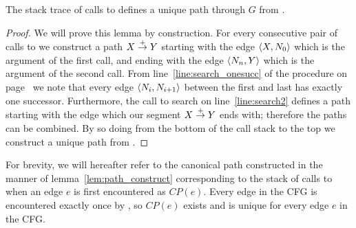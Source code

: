 \documentclass[12pt,titlepage,twoside]{article}
\begin{document}
\begin{lemma}\label{lem:path_construct}
The stack trace of calls to  defines a unique path
through $G$ from .
\end{lemma}
\begin{proof}
We will prove this lemma by construction.  For every consecutive pair
of calls to  we construct a path $X\stackrel{+}{\rightarrow} Y$ starting with the
edge $\left\langle X,N_0 \right\rangle$ which is the argument of the first call, and
ending with the edge $\left\langle N_n, Y \right\rangle$ which is the argument of the
second call.  From line~\ref{line:search_onesucc} of the 
procedure on page~\pageref{line:search_onesucc} we note that every
edge $\left\langle N_i, N_{i+1} \right\rangle$ between the first and last has exactly one
successor.  Furthermore, the call to search on line~\ref{line:search2}
defines a path starting with the edge which our segment $X\stackrel{+}{\rightarrow} Y$
ends with; therefore the paths can be combined.  By so doing from the
bottom of the call stack to the top we construct a unique path from
.
\end{proof}

For brevity, we will hereafter refer to the canonical path constructed
in the manner of lemma~\ref{lem:path_construct} corresponding to the
stack of calls to  when an edge $e$ is first
encountered as $CP(e)$.  Every edge in the CFG is encountered exactly
once by , so $CP(e)$ exists and is unique for every edge
$e$ in the CFG.
\end{document}
